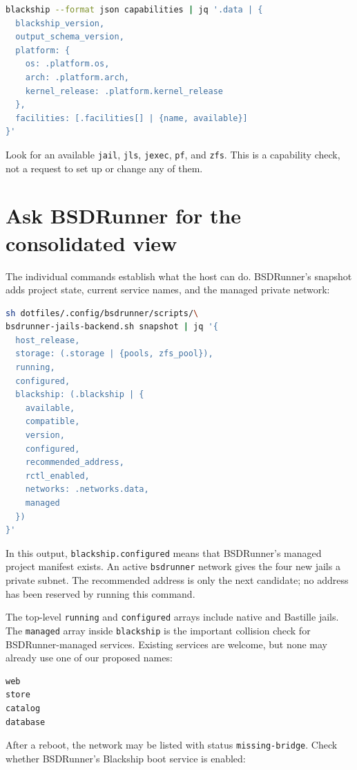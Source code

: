 \begin{lstlisting}[language=sh]
blackship --format json capabilities | jq '.data | {
  blackship_version,
  output_schema_version,
  platform: {
    os: .platform.os,
    arch: .platform.arch,
    kernel_release: .platform.kernel_release
  },
  facilities: [.facilities[] | {name, available}]
}'
\end{lstlisting}

Look for an available \texttt{jail}, \texttt{jls}, \texttt{jexec}, \texttt{pf},
and \texttt{zfs}. This is a capability check, not a request to set up or change
any of them.

\section{Ask BSDRunner for the consolidated view}

The individual commands establish what the host can do. BSDRunner's snapshot
adds project state, current service names, and the managed private network:

\begin{lstlisting}[language=sh]
sh dotfiles/.config/bsdrunner/scripts/\
bsdrunner-jails-backend.sh snapshot | jq '{
  host_release,
  storage: (.storage | {pools, zfs_pool}),
  running,
  configured,
  blackship: (.blackship | {
    available,
    compatible,
    version,
    configured,
    recommended_address,
    rctl_enabled,
    networks: .networks.data,
    managed
  })
}'
\end{lstlisting}

In this output, \texttt{blackship.configured} means that BSDRunner's managed
project manifest exists. An active \texttt{bsdrunner} network gives the four new
jails a private subnet. The recommended address is only the next candidate; no
address has been reserved by running this command.

The top-level \texttt{running} and \texttt{configured} arrays include native
and Bastille jails. The \texttt{managed} array inside \texttt{blackship} is the
important collision check for BSDRunner-managed services. Existing services
are welcome, but none may already use one of our proposed names:

\begin{lstlisting}
web
store
catalog
database
\end{lstlisting}

After a reboot, the network may be listed with status \texttt{missing-bridge}.
Check whether BSDRunner's Blackship boot service is enabled:

